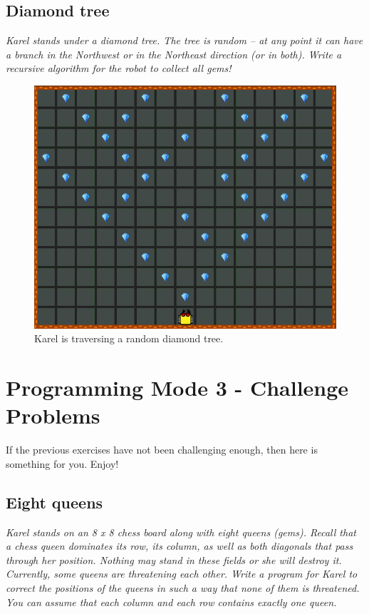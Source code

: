 \subsection{Diamond tree}

{\em Karel stands under a diamond tree. The tree is random -- at any point it can have 
a branch in the Northwest or in the Northeast direction (or in both). Write a recursive 
algorithm for the robot to collect all gems!}

\begin{figure}[!ht]
\begin{center}
\includegraphics[height=0.4\textwidth]{img/g04.png}
\end{center}
\vspace{-4mm}
\caption{Karel is traversing a random diamond tree.}
\label{fig:g04}
\vspace{-10mm}
\end{figure}


\newpage

\section{Programming Mode 3 - Challenge Problems}

If the previous exercises have not been challenging enough, then here is something 
for you. Enjoy!

\subsection{Eight queens}

\noindent
{\em Karel stands on an 8 x 8 chess board along with eight queens (gems). Recall that a chess queen dominates its row, its column, as well as both diagonals that pass through her position. Nothing may stand in these fields or she will destroy it. Currently, some queens are threatening each other. Write a program for Karel to correct the positions of the queens in such a way that none of them is threatened. You can assume that each column and each row contains exactly one queen. }

